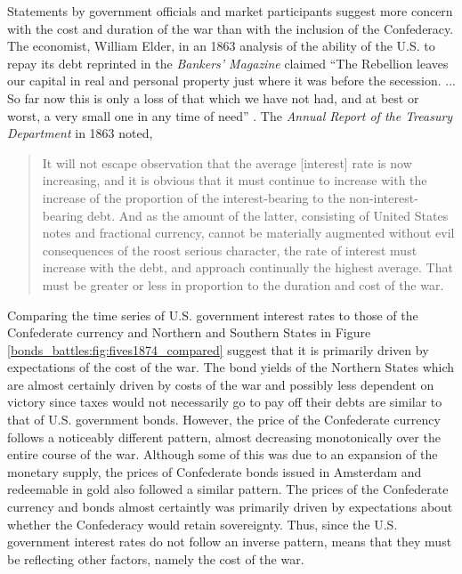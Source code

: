 Statements by government officials and market participants suggest more concern with the cost and duration of the war than with the inclusion of the Confederacy.
The economist, William Elder, in an 1863 analysis of the ability of the U.S. to repay its debt reprinted in the \textit{Bankers'  Magazine} claimed ``The Rebellion leaves our capital in real and personal property just where it was before the secession. ... So far now this is only a loss of that which we have not had, and at best or worst, a very small one in any time of need'' \parencite[19]{Elder1863}.
The \textit{Annual Report of the Treasury Department} in 1863 noted,
\begin{quote}
It will not escape observation that the average [interest] rate is now increasing, and it is obvious that it must continue to increase with the increase of the proportion of the interest-bearing to the non-interest-bearing debt.
And as the amount of the latter, consisting of United States notes and fractional currency, cannot be materially augmented without evil consequences of the roost serious character, the rate of interest must increase with the debt, and approach continually the highest average.
That must be greater or less in proportion to the duration and cost of the war. \parencite[13]{Treasury1863}
\end{quote}

Comparing the time series of U.S. government interest rates to those of the Confederate currency and Northern and Southern States in Figure \ref{bonds_battles:fig:fives1874_compared} suggest that it is primarily driven by expectations of the cost of the war.
The bond yields of the Northern States which are almost certainly driven by costs of the war and possibly less dependent on victory since taxes would not necessarily go to pay off their debts are similar to that of U.S. government bonds.
However, the price of the Confederate currency follows a noticeably different pattern, almost decreasing monotonically over the entire course of the war.
Although some of this was due to an expansion of the monetary supply, the prices of Confederate bonds issued in Amsterdam and redeemable in gold also followed a similar pattern.
The prices of the Confederate currency and bonds almost certaintly was primarily driven by expectations about whether the Confederacy would retain sovereignty.
Thus, since the U.S. government interest rates do not follow an inverse pattern, means that they must be reflecting other factors, namely the cost of the war.

